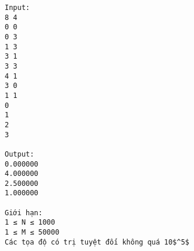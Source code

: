 \begin{verbatim}
Input:
8 4
0 0
0 3
1 3
3 1
3 3
4 1
3 0
1 1
0
1
2
3

Output:
0.000000
4.000000
2.500000
1.000000

Giới hạn:
1 ≤ N ≤ 1000 
1 ≤ M ≤ 50000
Các tọa độ có trị tuyệt đối không quá 10$^5$\end{verbatim}